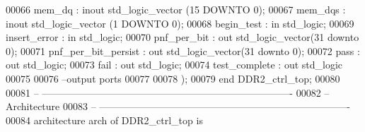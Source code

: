 \begin{DoxyCode}
00066         \textcolor{vhdlchar}{mem_dq}              \textcolor{vhdlchar}{:} \textcolor{keywordflow}{inout} \textcolor{comment}{std\_logic\_vector} \textcolor{vhdlchar}{(}\textcolor{vhdllogic}{}\textcolor{vhdllogic}{15} \textcolor{keywordflow}{DOWNTO} \textcolor{vhdllogic}{}\textcolor{vhdllogic}{0}\textcolor{vhdlchar}{)};
00067         \textcolor{vhdlchar}{mem_dqs}             \textcolor{vhdlchar}{:} \textcolor{keywordflow}{inout} \textcolor{comment}{std\_logic\_vector} \textcolor{vhdlchar}{(}\textcolor{vhdllogic}{}\textcolor{vhdllogic}{1} \textcolor{keywordflow}{DOWNTO} \textcolor{vhdllogic}{}\textcolor{vhdllogic}{0}\textcolor{vhdlchar}{)};
00068 \textcolor{vhdlkeyword}{        begin}\textcolor{vhdlchar}{\_test}              \textcolor{vhdlchar}{:} \textcolor{keywordflow}{in} \textcolor{comment}{std\_logic};
00069         \textcolor{vhdlchar}{insert_error}            \textcolor{vhdlchar}{:} \textcolor{keywordflow}{in} \textcolor{comment}{std\_logic};
00070         \textcolor{vhdlchar}{pnf_per_bit}         \textcolor{vhdlchar}{:} \textcolor{keywordflow}{out} \textcolor{comment}{std\_logic\_vector}\textcolor{vhdlchar}{(}\textcolor{vhdllogic}{}\textcolor{vhdllogic}{31} \textcolor{keywordflow}{downto} \textcolor{vhdllogic}{}\textcolor{vhdllogic}{0}\textcolor{vhdlchar}{)};   
00071         \textcolor{vhdlchar}{pnf_per_bit_persist}     \textcolor{vhdlchar}{:} \textcolor{keywordflow}{out} \textcolor{comment}{std\_logic\_vector}\textcolor{vhdlchar}{(}\textcolor{vhdllogic}{}\textcolor{vhdllogic}{31} \textcolor{keywordflow}{downto} \textcolor{vhdllogic}{}\textcolor{vhdllogic}{0}\textcolor{vhdlchar}{)};
00072         \textcolor{vhdlchar}{pass}                    \textcolor{vhdlchar}{:} \textcolor{keywordflow}{out} \textcolor{comment}{std\_logic};
00073         \textcolor{vhdlchar}{fail}                    \textcolor{vhdlchar}{:} \textcolor{keywordflow}{out} \textcolor{comment}{std\_logic}; 
00074         \textcolor{vhdlchar}{test_complete}           \textcolor{vhdlchar}{:} \textcolor{keywordflow}{out} \textcolor{comment}{std\_logic}
00075 
00076 \textcolor{keyword}{      --output ports }
00077         
00078         \textcolor{vhdlchar}{)};
00079 \textcolor{keywordflow}{end} \textcolor{vhdlchar}{DDR2\_ctrl\_top};
00080 
00081 \textcolor{keyword}{-- ----------------------------------------------------------------------------}
00082 \textcolor{keyword}{-- Architecture}
00083 \textcolor{keyword}{-- ----------------------------------------------------------------------------}
00084 \textcolor{keywordflow}{architecture} arch \textcolor{keywordflow}{of} DDR2_ctrl_top  is

\end{DoxyCode}
